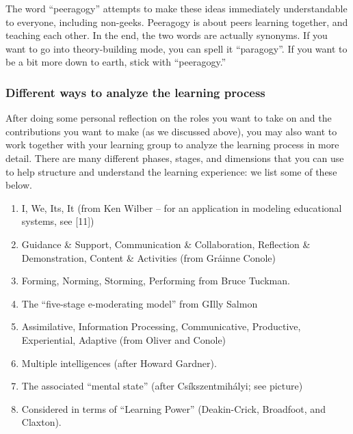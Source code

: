 The word ``peeragogy'' attempts to make these ideas immediately
understandable to everyone, including non-geeks. Peeragogy is about
peers learning together, and teaching each other. In the end, the two
words are actually synonyms. If you want to go into theory-building
mode, you can spell it ``paragogy''. If you want to be a bit more down
to earth, stick with ``peeragogy.''

\subsubsection{Different ways to analyze the learning process}

After doing some personal reflection on the roles you want to take on
and the contributions you want to make (as we discussed above), you may
also want to work together with your learning group to analyze the
learning process in more detail. There are many different phases,
stages, and dimensions that you can use to help structure and understand
the learning experience: we list some of these below.

\begin{enumerate}
\item
  I, We, Its, It (from Ken Wilber -- for an application in modeling
  educational systems, see {[}11{]})
\item
  Guidance \& Support, Communication \& Collaboration, Reflection \&
  Demonstration, Content \& Activities (from Gráinne Conole)
\item
  Forming, Norming, Storming, Performing from Bruce Tuckman.
\item
  The ``five-stage e-moderating model'' from GIlly Salmon
\item
  Assimilative, Information Processing, Communicative, Productive,
  Experiential, Adaptive (from Oliver and Conole)
\item
  Multiple intelligences (after Howard Gardner).
\item
  The associated ``mental state'' (after Csíkszentmihályi; see picture)
\item
  Considered in terms of ``Learning Power'' (Deakin-Crick, Broadfoot,
  and Claxton).
\end{enumerate}

